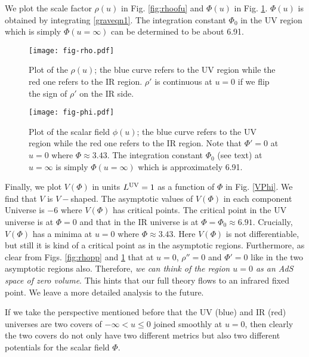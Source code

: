 \documentclass[prd,reprint,a4paper,showpacs,superscriptaddress,11pt,onecolumn,nofootinbib]{revtex4-1}
\renewcommand{\(}{\left(}
\renewcommand{\)}{\right)}
\newcommand{\6}{\partial}
\begin{document}
We plot the scale factor $\rho\left(u\right)$ in Fig. \ref{fig:rhoofu} and $\Phi\left(u\right)$ in Fig. \ref{fig:phiofu}. $\Phi(u)$ is obtained by integrating \eqref{graveqn1}. The integration constant $\Phi_0$ in the UV region which is simply $\Phi(u= \infty)$ can be determined to be about 6.91.
\begin{figure}[ht]
\begin{minipage}[b]{0.45\linewidth}
\centering
\texttt{[image: fig-rho.pdf]}
\caption{\label{fig:rhoofu}Plot of the $\rho\left(u\right)$; the blue curve refers to the UV region while the red one refers to the IR region. $\rho'$ is continuous at $u=0$ if we flip the sign of $\rho'$ on the IR side.}
\end{minipage}
\hspace{0.5cm}
\begin{minipage}[b]{0.45\linewidth}
\centering
\texttt{[image: fig-phi.pdf]}
\caption{\label{fig:phiofu}Plot of the scalar field $\phi\left(u\right)$; the blue curve refers to the UV region while the red one refers to the IR region. Note that $\Phi'=0$ at $u= 0$ where $\Phi \approx 3.43$. The integration constant $\Phi_0$ (see text) at $u=\infty$ is simply $\Phi (u= \infty)$ which is approximately 6.91.}
\end{minipage}
\end{figure}

Finally, we plot $V(\Phi)$ in units $L^{\rm UV} =1$ as a function of $\Phi$ in Fig. \ref{VPhi}. We find that $V$ is $V-$shaped. The asymptotic values of $V(\Phi)$ in each component Universe is $-6$ where $V(\Phi)$ has critical points. The critical point in the UV universe is at $\Phi = 0$ and that in the IR universe is at $\Phi = \Phi_0 \approx 6.91$. Crucially, $V(\Phi)$ has a minima at $u= 0$ where $\Phi \approx 3.43$. Here $V(\Phi)$ is not differentiable, but still it is kind of a critical point as in the asymptotic regions. Furthermore, as clear from Figs. \ref{fig:rhopp} and \ref{fig:phiofu} that at $u=0$, $\rho'' = 0$ and $\Phi'= 0$ like in the two asymptotic regions also. Therefore, \textit{we can think of the region $u= 0$ as an AdS space of zero volume}. This hints that our full theory flows to an infrared fixed point. We leave a more detailed analysis to the future. 

If we take the perspective mentioned before that the UV (blue) and IR (red) universes are two covers of $-\infty < u \leq 0$ joined smoothly at $u = 0$, then clearly the two covers do not only have two different metrics but also two different potentials for the scalar field $\Phi$.
\end{document}
